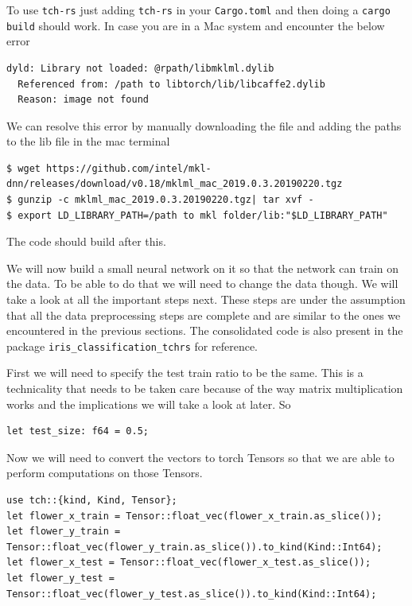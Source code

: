 \documentclass{book}
\begin{document}
To use \lstinline{tch-rs} just adding \lstinline{tch-rs} in your \lstinline{Cargo.toml} and then doing a \lstinline{cargo build} should work. In case you are in a Mac system and encounter the below error

\begin{lstlisting}[caption={}]
dyld: Library not loaded: @rpath/libmklml.dylib
  Referenced from: /path to libtorch/lib/libcaffe2.dylib
  Reason: image not found
\end{lstlisting}

We can resolve this error by manually downloading the file and adding the paths to the lib file in the mac terminal


\begin{lstlisting}[caption={installation}]
$ wget https://github.com/intel/mkl-dnn/releases/download/v0.18/mklml_mac_2019.0.3.20190220.tgz
$ gunzip -c mklml_mac_2019.0.3.20190220.tgz| tar xvf -
$ export LD_LIBRARY_PATH=/path to mkl folder/lib:"$LD_LIBRARY_PATH"
\end{lstlisting}

The code should build after this.

We will now build a small neural network on it so that the network can train on the data. To be able to do that we will need to change the data though. We will take a look at all the important steps next. These steps are under the assumption that all the data preprocessing steps are complete and are similar to the ones we encountered in the previous sections. The consolidated code is also present in the package \lstinline{iris_classification_tchrs} for reference.

First we will need to specify the test train ratio to be the same. This is a technicality that needs to be taken care because of the way matrix multiplication works and the implications we will take a look at later. So

\begin{lstlisting}[caption={iris\_classification\_tchrs}]
let test_size: f64 = 0.5;
\end{lstlisting}

Now we will need to convert the vectors to torch Tensors so that we are able to perform computations on those Tensors.

\begin{lstlisting}[caption={chapter3\\/iris\_classification\_tchrs\\/src\\/main\\.rs}]
use tch::{kind, Kind, Tensor};
let flower_x_train = Tensor::float_vec(flower_x_train.as_slice());
let flower_y_train = Tensor::float_vec(flower_y_train.as_slice()).to_kind(Kind::Int64);
let flower_x_test = Tensor::float_vec(flower_x_test.as_slice());
let flower_y_test = Tensor::float_vec(flower_y_test.as_slice()).to_kind(Kind::Int64);
\end{lstlisting}
\end{document}
